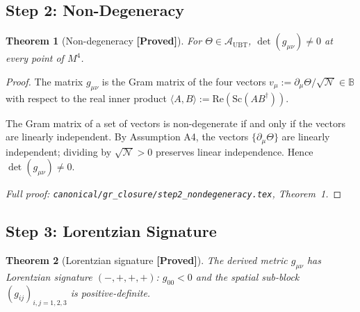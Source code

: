 \documentclass[12pt,a4paper]{article}
\newtheorem{theorem}{Theorem}[section]
\theoremstyle{definition}
\theoremstyle{remark}
\newcommand{\PROVED}{\textbf{[Proved]}}
\begin{document}
\subsection{Step 2: Non-Degeneracy}
\label{sec:step2}

\begin{theorem}[Non-degeneracy \PROVED]
\label{thm:nondeg}
For $\Theta\in\mathcal{A}_{\mathrm{UBT}}$,
$\det(g_{\mu\nu})\neq 0$ at every point of $M^4$.
\end{theorem}

\begin{proof}
The matrix $g_{\mu\nu}$ is the Gram matrix of the four vectors
$v_\mu := \partial_\mu\Theta/\sqrt{\mathcal{N}} \in \mathbb{B}$
with respect to the real inner product
$\langle A,B\rangle := \mathrm{Re}(\mathrm{Sc}(AB^\dagger))$.

The Gram matrix of a set of vectors is non-degenerate if and only if the
vectors are linearly independent.  By Assumption A4, the vectors
$\{\partial_\mu\Theta\}$ are linearly independent; dividing by $\sqrt{\mathcal{N}}>0$
preserves linear independence.  Hence $\det(g_{\mu\nu})\neq 0$.

\smallskip
\noindent\textit{Full proof: \texttt{canonical/gr\_closure/step2\_nondegeneracy.tex},
Theorem~1.}
\end{proof}

\subsection{Step 3: Lorentzian Signature}
\label{sec:step3}

\begin{theorem}[Lorentzian signature \PROVED]
\label{thm:signature}
The derived metric $g_{\mu\nu}$ has Lorentzian signature $(-,+,+,+)$:
$g_{00}<0$ and the spatial sub-block $(g_{ij})_{i,j=1,2,3}$ is
positive-definite.
\end{theorem}
\end{document}
